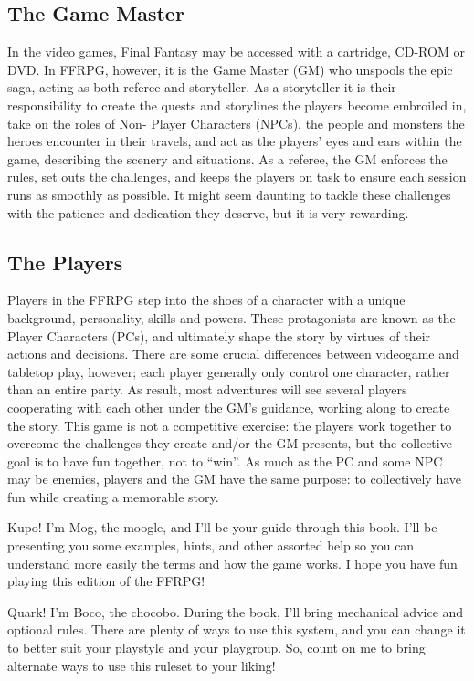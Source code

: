 \begin{multicols}{2}
\subsection{The Game Master}
\label{subsec:gm}
In the video games, Final Fantasy may be
accessed with a cartridge, CD-ROM or DVD. In
FFRPG, however, it is the Game Master (GM) who
unspools the epic saga, acting as both referee and
storyteller. As a storyteller it is their responsibility
to create the quests and storylines the players
become embroiled in, take on the roles of Non-
Player Characters (NPCs), the people and
monsters the heroes encounter in their travels,
and act as the players' eyes and ears within the
game, describing the scenery and situations. As a
referee, the GM enforces the rules, set outs the
challenges, and keeps the players on task to ensure
each session runs as smoothly as possible. It might
seem daunting to tackle these challenges with the
patience and dedication they deserve, but it is very
rewarding.

\subsection{The Players}
\label{subsec:players}
Players in the FFRPG step into the shoes of a
character with a unique background, personality,
skills and powers. These protagonists are known
as the Player Characters (PCs), and ultimately
shape the story by virtues of their actions and
decisions. There are some crucial differences
between videogame and tabletop play, however;
each player generally only control one character,
rather than an entire party. As result, most
adventures will see several players cooperating
with each other under the GM's guidance, working
along to create the story. This game is not a
competitive exercise: the players work together to
overcome the challenges they create and/or the
GM presents, but the collective goal is to have fun
together, not to “win”. As much as the PC and some
NPC may be enemies, players and the GM have the
same purpose: to collectively have fun while
creating a memorable story.

\begin{mog}
Kupo! I'm Mog, the moogle, and I'll be your guide
through this book. I'll be presenting you some examples,
hints, and other assorted help so you can understand
more easily the terms and how the game works. I hope
you have fun playing this edition of the FFRPG!
\end{mog}

\begin{boco}
Quark! I'm Boco, the chocobo. During the
book, I'll bring mechanical advice and optional
rules. There are plenty of ways to use this system,
and you can change it to better suit your playstyle
and your playgroup. So, count on me to bring
alternate ways to use this ruleset to your liking!
\end{boco}
\end{multicols}

